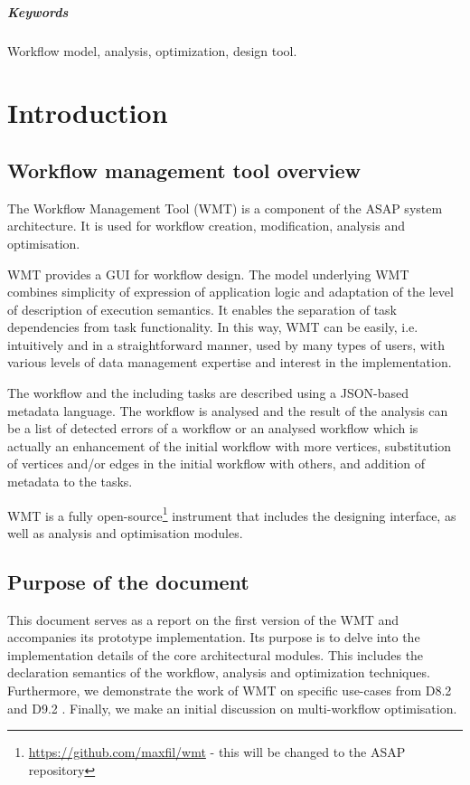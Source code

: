 \documentclass[12pt,openany,onecolumn]{book}
\begin{document}
\smallskip
\paragraph{Keywords} Workflow model, analysis, optimization, design tool.


\tableofcontents

\newpage
{}
{}
\listoffigures
\begingroup
\renewcommand{\cleardoublepage}{}
\renewcommand{\clearpage}{}
{}
\listoftables
\endgroup


\chapter{Introduction}

\section{Workflow management tool overview}
The Workflow Management Tool (WMT) is a component of the ASAP system architecture. It is used for workflow creation, modification, analysis and optimisation.

WMT provides a GUI for workflow design. The model underlying WMT combines simplicity of expression of application logic and adaptation of the level of description of execution semantics. It enables the separation of task dependencies from task functionality. In this way, WMT can be easily, i.e. intuitively and in a straightforward manner, used by many types of users, with various levels of data management expertise and interest in the implementation.

The workflow and the including tasks are described using a JSON-based metadata language. The workflow is analysed and the result of the analysis can be a list of detected errors of a workflow or an analysed workflow which is actually an enhancement of the initial workflow with more vertices, substitution of vertices and/or edges in the initial workflow with others, and addition of metadata to the tasks.

WMT is a fully open-source\footnote{\url{https://github.com/maxfil/wmt}  - this will be changed to the ASAP repository} instrument that includes the designing interface, as well as analysis and optimisation modules.

\section{Purpose of the document}
This document serves as a report on the first version of the WMT and accompanies its prototype implementation. Its purpose is to delve into the implementation details of the core architectural modules. This includes the declaration semantics of the workflow, analysis and optimization techniques. Furthermore, we demonstrate the work of WMT on specific use-cases from D8.2 \cite{d8.2} and D9.2 \cite{d9.2}. Finally, we make an initial discussion on multi-workflow optimisation.
\end{document}
